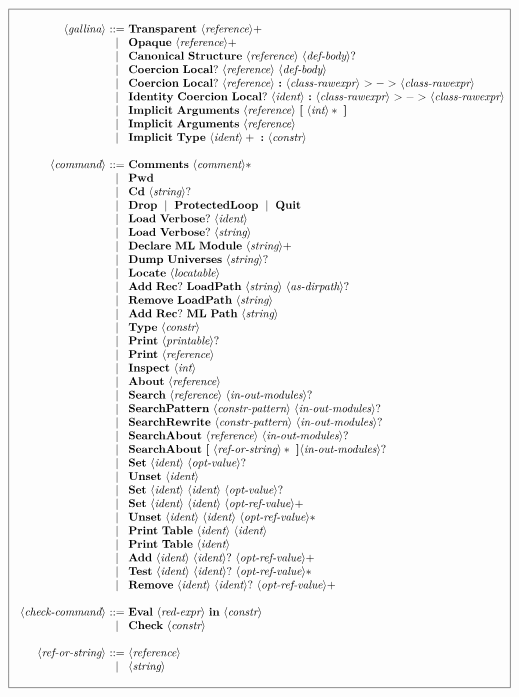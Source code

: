 \documentclass{article}
\makeatletter
\def\NT#1{\langle\textit{#1}\rangle}
\def\TERM#1{{\bf\textrm{\bf #1}}}
\def\KWD#1{\TERM{#1}}
\def\STAR#1{#1*}
\def\PLUS#1{#1+}
\def\OPT#1{#1?}
\newenvironment{cadre}
        {\begin{array}{|c|}\hline\\}
        {\\\\\hline\end{array}}
\newenvironment{rulebox}
        {$$\begin{cadre}\begin{array}{r@{~}c@{~}l@{}l@{}r}}
        {\end{array}\end{cadre}$$}
\def\DEFNT#1{\NT{#1} & ::= &}
\def\SEPDEF{\\\\}
\def\nlsep{\\&|&}
\newenvironment{rules}
        {\begin{center}\begin{rulebox}}
        {\end{rulebox}\end{center}}
\makeatother
\begin{document}
\begin{rules}
\DEFNT{gallina}
       \TERM{Transparent}~\PLUS{\NT{reference}}
\nlsep \TERM{Opaque}~\PLUS{\NT{reference}}
\nlsep \TERM{Canonical}~\TERM{Structure}~\NT{reference}~\OPT{\NT{def-body}}
\nlsep \TERM{Coercion}~\OPT{\TERM{Local}}~\NT{reference}~\NT{def-body}
\nlsep \TERM{Coercion}~\OPT{\TERM{Local}}~\NT{reference}~\KWD{:}
       ~\NT{class-rawexpr}~\TERM{$>->$}~\NT{class-rawexpr}
\nlsep \TERM{Identity}~\TERM{Coercion}~\OPT{\TERM{Local}}~\NT{ident}~\KWD{:}
       ~\NT{class-rawexpr}~\TERM{$>->$}~\NT{class-rawexpr}
\nlsep \TERM{Implicit}~\TERM{Arguments}~\NT{reference}~\TERM{[}~\STAR{\NT{int}}~\TERM{]}
\nlsep \TERM{Implicit}~\TERM{Arguments}~\NT{reference}
\nlsep \TERM{Implicit}~\KWD{Type}~\PLUS{\NT{ident}}~\KWD{:}~\NT{constr}
\SEPDEF
\DEFNT{command}
       \TERM{Comments}~\STAR{\NT{comment}}
\nlsep \TERM{Pwd}
\nlsep \TERM{Cd}~\OPT{\NT{string}}
\nlsep \TERM{Drop} ~\mid~ \TERM{ProtectedLoop} ~\mid~\TERM{Quit}
\nlsep \TERM{Load}~\OPT{\TERM{Verbose}}~\NT{ident}
\nlsep \TERM{Load}~\OPT{\TERM{Verbose}}~\NT{string}
\nlsep \TERM{Declare}~\TERM{ML}~\TERM{Module}~\PLUS{\NT{string}}
\nlsep \TERM{Dump}~\TERM{Universes}~\OPT{\NT{string}}
\nlsep \TERM{Locate}~\NT{locatable}
\nlsep \TERM{Add}~\OPT{\TERM{Rec}}~\TERM{LoadPath}~\NT{string}~\OPT{\NT{as-dirpath}}
\nlsep \TERM{Remove}~\TERM{LoadPath}~\NT{string}
\nlsep \TERM{Add}~\OPT{\TERM{Rec}}~\TERM{ML}~\TERM{Path}~\NT{string}
\nlsep \KWD{Type}~\NT{constr}
\nlsep \TERM{Print}~\OPT{\NT{printable}}
\nlsep \TERM{Print}~\NT{reference}
\nlsep \TERM{Inspect}~\NT{int}
\nlsep \TERM{About}~\NT{reference}
\nlsep \TERM{Search}~\NT{reference}~\OPT{\NT{in-out-modules}}
\nlsep \TERM{SearchPattern}~\NT{constr-pattern}~\OPT{\NT{in-out-modules}}
\nlsep \TERM{SearchRewrite}~\NT{constr-pattern}~\OPT{\NT{in-out-modules}}
\nlsep \TERM{SearchAbout}~\NT{reference}~\OPT{\NT{in-out-modules}}
\nlsep \TERM{SearchAbout}~\TERM{[}~\STAR{\NT{ref-or-string}}~\TERM{]}\OPT{\NT{in-out-modules}}
\nlsep \KWD{Set}~\NT{ident}~\OPT{\NT{opt-value}}
\nlsep \TERM{Unset}~\NT{ident}
\nlsep \KWD{Set}~\NT{ident}~\NT{ident}~\OPT{\NT{opt-value}}
\nlsep \KWD{Set}~\NT{ident}~\NT{ident}~\PLUS{\NT{opt-ref-value}}
\nlsep \TERM{Unset}~\NT{ident}~\NT{ident}~\STAR{\NT{opt-ref-value}}
\nlsep \TERM{Print}~\TERM{Table}~\NT{ident}~\NT{ident}
\nlsep \TERM{Print}~\TERM{Table}~\NT{ident}
\nlsep \TERM{Add}~\NT{ident}~\OPT{\NT{ident}}~\PLUS{\NT{opt-ref-value}}
\nlsep \TERM{Test}~\NT{ident}~\OPT{\NT{ident}}~\STAR{\NT{opt-ref-value}}
\nlsep \TERM{Remove}~\NT{ident}~\OPT{\NT{ident}}~\PLUS{\NT{opt-ref-value}}
\SEPDEF
\DEFNT{check-command}
       \TERM{Eval}~\NT{red-expr}~\KWD{in}~\NT{constr}
\nlsep \TERM{Check}~\NT{constr}
\SEPDEF
\DEFNT{ref-or-string}
       \NT{reference}
\nlsep \NT{string}
\end{rules}
\end{document}
